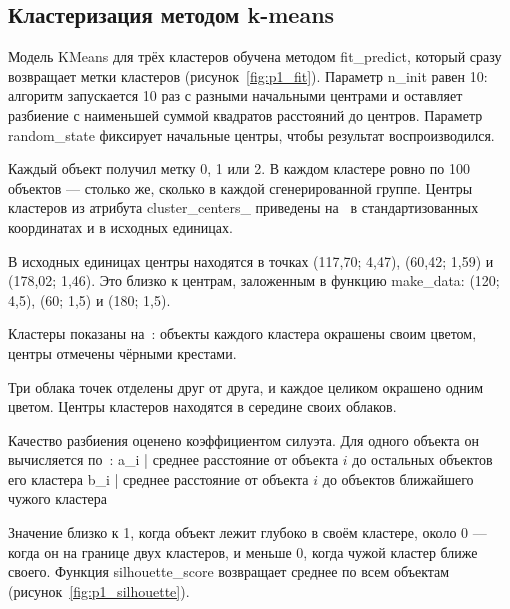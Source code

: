\documentclass[a4paper,14pt]{extarticle}
\begin{document}

\subsection{Кластеризация методом k-means}

Модель KMeans для трёх кластеров обучена методом fit\_predict, который сразу возвращает метки кластеров (рисунок~\ref{fig:p1_fit}). Параметр n\_init равен 10: алгоритм запускается 10 раз с разными начальными центрами и оставляет разбиение с наименьшей суммой квадратов расстояний до центров. Параметр random\_state фиксирует начальные центры, чтобы результат воспроизводился.


Каждый объект получил метку 0, 1 или 2. В каждом кластере ровно по 100 объектов — столько же, сколько в каждой сгенерированной группе. Центры кластеров из атрибута cluster\_centers\_ приведены на~ в стандартизованных координатах и в исходных единицах.


В исходных единицах центры находятся в точках (117,70; 4,47), (60,42; 1,59) и (178,02; 1,46). Это близко к центрам, заложенным в функцию make\_data: (120; 4,5), (60; 1,5) и (180; 1,5).

Кластеры показаны на~: объекты каждого кластера окрашены своим цветом, центры отмечены чёрными крестами.


Три облака точек отделены друг от друга, и каждое целиком окрашено одним цветом. Центры кластеров находятся в середине своих облаков.

Качество разбиения оценено коэффициентом силуэта. Для одного объекта он вычисляется по~:
a_i | среднее расстояние от объекта $i$ до остальных объектов его кластера
b_i | среднее расстояние от объекта $i$ до объектов ближайшего чужого кластера

Значение близко к 1, когда объект лежит глубоко в своём кластере, около 0 — когда он на границе двух кластеров, и меньше 0, когда чужой кластер ближе своего. Функция silhouette\_score возвращает среднее по всем объектам (рисунок~\ref{fig:p1_silhouette}).
\end{document}

